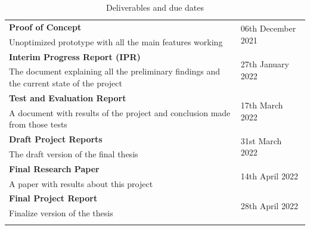 \begin{longtable}{|p{115mm}|p{35mm}|}
\textbf{Proof of Concept} & \multirow{2}{*}{06th December 2021} \\
Unoptimized prototype with all the main features working &  \\ \hline
\textbf{Interim Progress Report (IPR)} & \multirow{2}{*}{27th January 2022} \\
The document explaining all the preliminary findings and the current state of the project &  \\ \hline
\textbf{Test and Evaluation Report} & \multirow{2}{*}{17th March 2022} \\
A document with results of the project and conclusion made from those tests &  \\ \hline
\textbf{Draft Project Reports} & \multirow{2}{*}{31st March 2022} \\
The draft version of the final thesis &  \\ \hline
\textbf{Final Research Paper} & \multirow{2}{*}{14th April 2022} \\
A paper with results about this project &  \\ \hline
\textbf{Final Project Report} & \multirow{2}{*}{28th April 2022} \\
Finalize version of the thesis &  \\ \hline
\caption{Deliverables and due dates}
\end{longtable}

